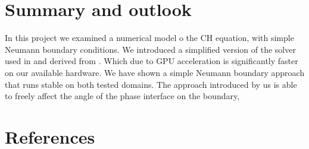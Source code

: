 \documentclass{mimosis}
\begin{document}
\chapter{Summary and outlook}
\label{sec:org0664668}
In this project we examined a numerical model o the CH equation, with simple Neumann boundary conditions. We introduced a simplified version of the solver used in \autocite{Ulmer_CHRelaxed_2024} and derived from \autocite{SHIN20117441}. Which due to GPU acceleration is significantly faster on our available hardware. We have shown a simple Neumann boundary approach that runs stable on both tested domains. The approach introduced by us is able to freely affect the angle of the phase interface on the boundary,
\chapter{References}
\label{sec:org34e895a}
\printbibliography
\end{document}
